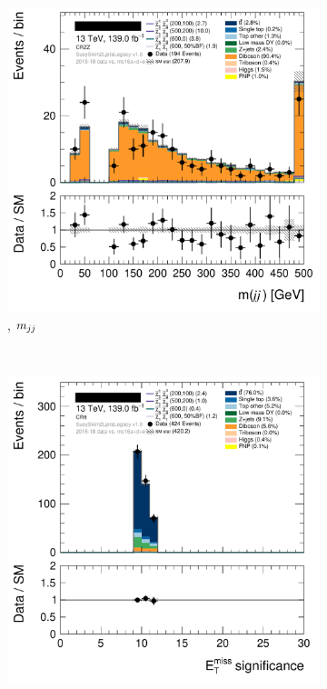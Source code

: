 \begin{figure}[tp]
\begin{subfigure}{0.495\textwidth}
\includegraphics[width=\textwidth]{figures/2ljets_def_mjj_CRZZ.png}
\caption{\crvz, $m_{jj}$}
\end{subfigure}
\\[0.5em]
\begin{subfigure}{0.495\textwidth}
\centering
\includegraphics[width=\textwidth]{figures/2ljets_def_met_Sign_CRtt.png}

\end{subfigure}
\end{figure}
